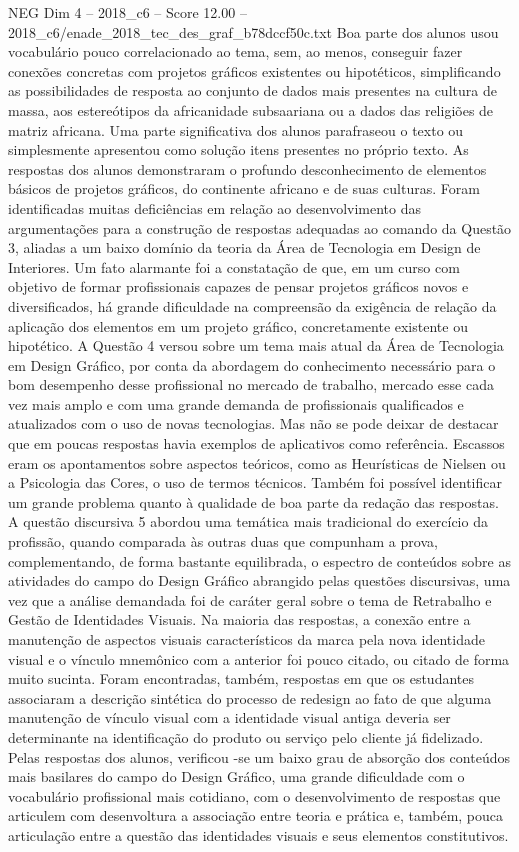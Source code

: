 \begin{textsample}{NEG Dim 4 – 2018\_c6 – Score 12.00 – 2018\_c6/enade\_2018\_tec\_des\_graf\_b78dccf50c.txt}
Boa parte dos alunos usou vocabulário pouco correlacionado ao tema, sem, ao menos, conseguir fazer conexões concretas com projetos gráficos existentes ou hipotéticos, simplificando as possibilidades de resposta ao conjunto de dados mais presentes na cultura de massa, aos estereótipos da africanidade subsaariana ou a dados das religiões de matriz africana.
Uma parte significativa dos alunos parafraseou o texto ou simplesmente apresentou como solução itens presentes no próprio texto.
As respostas dos alunos demonstraram o profundo desconhecimento de elementos básicos de projetos gráficos, do continente africano e de suas culturas.
Foram identificadas muitas deficiências em relação ao desenvolvimento das argumentações para a construção de respostas adequadas ao comando da Questão 3, aliadas a um baixo domínio da teoria da Área de Tecnologia em Design de Interiores.
Um fato alarmante foi a constatação de que, em um curso com objetivo de formar profissionais capazes de pensar projetos gráficos novos e diversificados, há grande dificuldade na compreensão da exigência de relação da aplicação dos elementos em um projeto gráfico, concretamente existente ou hipotético.
A Questão 4 versou sobre um tema mais atual da Área de Tecnologia em Design Gráfico, por conta da abordagem do conhecimento necessário para o bom desempenho desse profissional no mercado de trabalho, mercado esse cada vez mais amplo e com uma grande demanda de profissionais qualificados e atualizados com o uso de novas tecnologias.
Mas não se pode deixar de destacar que em poucas respostas havia exemplos de aplicativos como referência.
Escassos eram os apontamentos sobre aspectos teóricos, como as Heurísticas de Nielsen ou a Psicologia das Cores, o uso de termos técnicos.
Também foi possível identificar um grande problema quanto à qualidade de boa parte da redação das respostas.
A questão discursiva 5 abordou uma temática mais tradicional do exercício da profissão, quando comparada às outras duas que compunham a prova, complementando, de forma bastante equilibrada, o espectro de conteúdos sobre as atividades do campo do Design Gráfico abrangido pelas questões discursivas, uma vez que a análise demandada foi de caráter geral sobre o tema de Retrabalho e Gestão de Identidades Visuais.
Na maioria das respostas, a conexão entre a manutenção de aspectos visuais característicos da marca pela nova identidade visual e o vínculo mnemônico com a anterior foi pouco citado, ou citado de forma muito sucinta.
Foram encontradas, também, respostas em que os estudantes associaram a descrição sintética do processo de redesign ao fato de que alguma manutenção de vínculo visual com a identidade visual antiga deveria ser determinante na identificação do produto ou serviço pelo cliente já fidelizado.
Pelas respostas dos alunos, verificou -se um baixo grau de absorção dos conteúdos mais basilares do campo do Design Gráfico, uma grande dificuldade com o vocabulário profissional mais cotidiano, com o desenvolvimento de respostas que articulem com desenvoltura a associação entre teoria e prática e, também, pouca articulação entre a questão das identidades visuais e seus elementos constitutivos.

\end{textsample}
